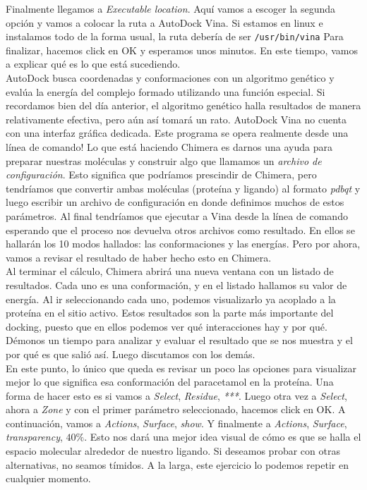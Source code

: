 \documentclass[10pt,letterpaper]{article}
\newcommand{\inlinecode}[1]{
\colorbox{light-gray}{\texttt{#1}}
}
\begin{document}
Finalmente llegamos a \emph{Executable location}. Aqu\'i vamos a escoger la segunda opci\'on y vamos a colocar la ruta a AutoDock Vina. Si estamos en linux e instalamos todo de la forma usual, la ruta deber\'ia de ser \inlinecode{/usr/bin/vina} Para finalizar, hacemos click en OK y esperamos unos minutos. En este tiempo, vamos a explicar qu\'e es lo que est\'a sucediendo.\\

AutoDock busca coordenadas y conformaciones con un algoritmo gen\'etico y eval\'ua la energ\'ia del complejo formado utilizando una funci\'on especial. Si recordamos bien del d\'ia anterior, el algoritmo gen\'etico halla resultados de manera relativamente efectiva, pero a\'un as\'i tomar\'a un rato. AutoDock Vina no cuenta con una interfaz gr\'afica dedicada. Este programa se opera realmente desde una l\'inea de comando! Lo que est\'a haciendo Chimera es darnos una ayuda para preparar nuestras mol\'eculas y construir algo que llamamos un \emph{archivo de configuraci\'on}. Esto significa que podr\'iamos prescindir de Chimera, pero tendr\'iamos que convertir ambas mol\'eculas (prote\'ina y ligando) al formato \emph{pdbqt} y luego escribir un archivo de configuraci\'on en donde definimos muchos de estos par\'ametros. Al final tendr\'iamos que ejecutar a Vina desde la l\'inea de comando esperando que el proceso nos devuelva otros archivos como resultado. En ellos se hallar\'an los 10 modos hallados: las conformaciones y las energ\'ias. Pero por ahora, vamos a revisar el resultado de haber hecho esto en Chimera.\\

Al terminar el c\'alculo, Chimera abrir\'a una nueva ventana con un listado de resultados. Cada uno es una conformaci\'on, y en el listado hallamos su valor de energ\'ia. Al ir seleccionando cada uno, podemos visualizarlo ya acoplado a la prote\'ina en el sitio activo. Estos resultados son la parte m\'as importante del docking, puesto que en ellos podemos ver qu\'e interacciones hay y por qu\'e. D\'emonos un tiempo para analizar y evaluar el resultado que se nos muestra y el por qu\'e es que sali\'o as\'i. Luego discutamos con los dem\'as.\\

En este punto, lo \'unico que queda es revisar un poco las opciones para visualizar mejor lo que significa esa conformaci\'on del paracetamol en la prote\'ina. Una forma de hacer esto es si vamos a \emph{Select}, \emph{Residue}, \emph{***}. Luego otra vez a \emph{Select}, ahora a \emph{Zone} y con el primer par\'ametro seleccionado, hacemos click en OK. A continuaci\'on, vamos a \emph{Actions}, \emph{Surface}, \emph{show}. Y finalmente a \emph{Actions}, \emph{Surface}, \emph{transparency}, $40\%$. Esto nos dar\'a una mejor idea visual de c\'omo es que se halla el espacio molecular alrededor de nuestro ligando. Si deseamos probar con otras alternativas, no seamos t\'imidos. A la larga, este ejercicio lo podemos repetir en cualquier momento.\\
\end{document}
